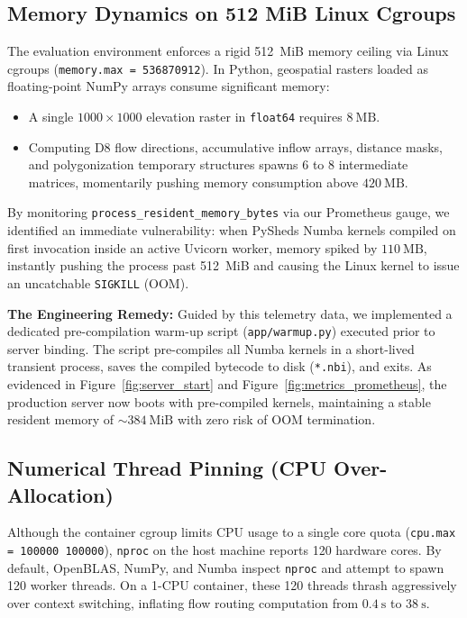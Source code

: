\documentclass[11pt,a4paper]{article}
\begin{document}
\subsection{Memory Dynamics on 512 MiB Linux Cgroups}
The evaluation environment enforces a rigid 512~MiB memory ceiling via Linux cgroups (\texttt{memory.max = 536870912}). In Python, geospatial rasters loaded as floating-point NumPy arrays consume significant memory:
\begin{itemize}[leftmargin=*]
    \item A single $1000 \times 1000$ elevation raster in \texttt{float64} requires $8~\text{MB}$.
    \item Computing D8 flow directions, accumulative inflow arrays, distance masks, and polygonization temporary structures spawns 6 to 8 intermediate matrices, momentarily pushing memory consumption above $420~\text{MB}$.
\end{itemize}

By monitoring \texttt{process\_resident\_memory\_bytes} via our Prometheus gauge, we identified an immediate vulnerability: when PySheds Numba kernels compiled on first invocation inside an active Uvicorn worker, memory spiked by $110~\text{MB}$, instantly pushing the process past 512~MiB and causing the Linux kernel to issue an uncatchable \texttt{SIGKILL} (OOM).

\textbf{The Engineering Remedy:} Guided by this telemetry data, we implemented a dedicated pre-compilation warm-up script (\texttt{app/warmup.py}) executed prior to server binding. The script pre-compiles all Numba kernels in a short-lived transient process, saves the compiled bytecode to disk (\texttt{*.nbi}), and exits. As evidenced in Figure~\ref{fig:server_start} and Figure~\ref{fig:metrics_prometheus}, the production server now boots with pre-compiled kernels, maintaining a stable resident memory of $\sim 384~\text{MiB}$ with zero risk of OOM termination.

\subsection{Numerical Thread Pinning (CPU Over-Allocation)}
Although the container cgroup limits CPU usage to a single core quota (\texttt{cpu.max = 100000 100000}), \texttt{nproc} on the host machine reports 120 hardware cores. By default, OpenBLAS, NumPy, and Numba inspect \texttt{nproc} and attempt to spawn 120 worker threads. On a 1-CPU container, these 120 threads thrash aggressively over context switching, inflating flow routing computation from $0.4~\text{s}$ to $38~\text{s}$. 
\end{document}

